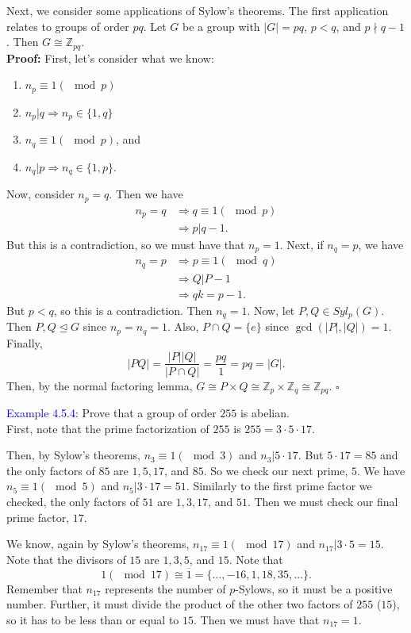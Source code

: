 \documentclass{article}
\begin{document}
Next, we consider some applications of Sylow's theorems. The first application relates to groups of order $pq$. Let $G$ be a group with 
$|G|=pq$, $p < q$, and $p \nmid q-1$. Then $G \cong \mathbb{Z}_{pq}$.\\
\textbf{Proof:} First, let's consider what we know:
\begin{enumerate}
    \item $n_p \equiv 1(\mod{p})$
    \item $n_p | q \Longrightarrow n_p \in \{1,q\}$
    \item $n_q \equiv 1(\mod{p})$, and 
    \item $n_q | p \Longrightarrow n_q \in \{1,p\}$.
\end{enumerate}
Now, consider $n_p = q$. Then we have
\begin{align*}
    n_p=q &\Longrightarrow q \equiv 1(\mod{p}) \\
    &\Longrightarrow p|q-1.
\end{align*}
But this is a contradiction, so we must have that $n_p=1$. Next, if $n_q = p$, we have
\begin{align*}
    n_q=p &\Longrightarrow p \equiv 1(\mod{q}) \\
    &\Longrightarrow Q | P-1 \\
    &\Longrightarrow qk = p-1.
\end{align*}
But $p < q$, so this is a contradiction. Then $n_q=1$. Now, let $P, Q \in Syl_p(G)$. Then $P,Q \trianglelefteq G$ since $n_p=n_q=1$. Also, 
$P \cap Q = \{e\}$ since $\gcd{(|P|,|Q|)} = 1$. Finally,
\[
    |PQ| = \dfrac{|P||Q|}{|P \cap Q|}=\dfrac{pq}{1}=pq=|G|.
\]
Then, by the normal factoring lemma, $G \cong P \times Q \cong \mathbb{Z}_p \times \mathbb{Z}_q \cong \mathbb{Z}_{pq}$. $\square$

\textcolor{blue}{Example 4.5.4:} Prove that a group of order $255$ is abelian.\\
First, note that the prime factorization of $255$ is $255 = 3 \cdot 5 \cdot 17$. 

Then, by Sylow's theorems, $n_3 \equiv 1(\mod{3})$ and $n_3 | 5 \cdot 17$. But $5 \cdot 17=85$ and the only factors of $85$ are $1,5,17$, 
and $85$. So we check our next prime, $5$. We have $n_5 \equiv 1(\mod{5})$ and $n_5 | 3 \cdot 17=51$. Similarly to the first prime factor 
we checked, the only factors of $51$ are $1,3,17$, and $51$. Then we must check our final prime factor, $17$.

We know, again by Sylow's theorems, $n_{17} \equiv 1(\mod{17})$ and $n_{17} | 3 \cdot 5 = 15$. Note that the divisors of $15$ are $1,3,5$, 
and $15$. Note that 
\[
    1(\mod{17}) \cong \overline{1} = \{\dots, -16, 1, 18, 35, \dots \}.
\]
Remember that $n_{17}$ represents the number of $p$-Sylows, so it must be a positive number. Further, it must divide the product of the 
other two factors of $255$ ($15$), so it has to be less than or equal to $15$. Then we must have that $n_{17}=1$. 
\end{document}
